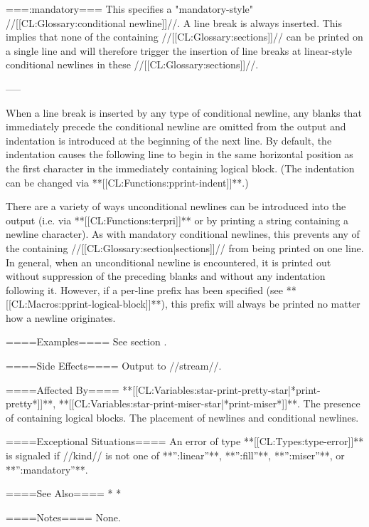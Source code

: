 ===:mandatory===
This specifies a "mandatory-style" //[[CL:Glossary:conditional newline]]//. A line break is always inserted. This implies that none of the containing //[[CL:Glossary:sections]]// can be printed on a single line and will therefore trigger the insertion of line breaks at linear-style conditional newlines in these //[[CL:Glossary:sections]]//.

-----

When a line break is inserted by any type of conditional newline, any blanks that immediately precede the conditional newline are omitted from the output and indentation is introduced at the beginning of the next line. By default, the indentation causes the following line to begin in the same horizontal position as the first character in the immediately containing logical block. (The indentation can be changed via **[[CL:Functions:pprint-indent]]**.)

There are a variety of ways unconditional newlines can be introduced into the output (i.e. via **[[CL:Functions:terpri]]** or by printing a string containing a newline character). As with mandatory conditional newlines, this prevents any of the containing //[[CL:Glossary:section|sections]]// from being printed on one line. In general, when an unconditional newline is encountered, it is printed out without suppression of the preceding blanks and without any indentation following it. However, if a per-line prefix has been specified (see **[[CL:Macros:pprint-logical-block]]**), this prefix will always be printed no matter how a newline originates.

====Examples====
See section {\secref\PrettyPrinterExamples}.

====Side Effects====
Output to //stream//.

====Affected By====
**[[CL:Variables:star-print-pretty-star|*print-pretty*]]**, **[[CL:Variables:star-print-miser-star|*print-miser*]]**. The presence of containing logical blocks. The placement of newlines and conditional newlines.

====Exceptional Situations====
An error of type **[[CL:Types:type-error]]** is signaled if //kind// is not one of **'':linear''**, **'':fill''**, **'':miser''**, or **'':mandatory''**.

====See Also====
  * {\secref\TildeUnderscore}
  * {\secref\PrettyPrinterExamples}

====Notes====
None.

 
